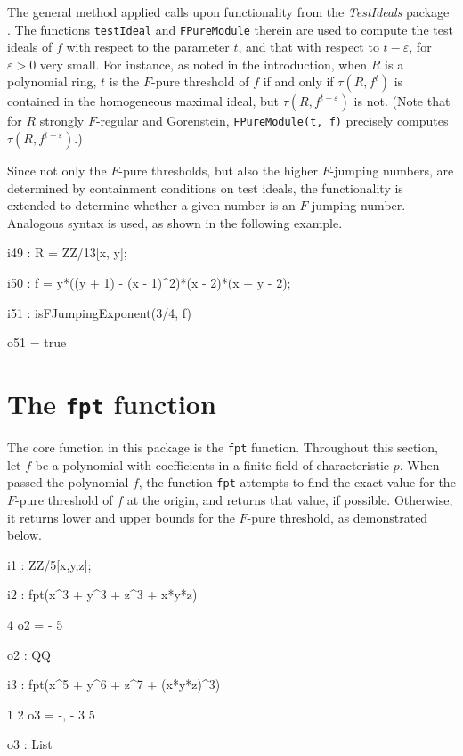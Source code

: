 \documentclass{amsart}
\begin{document}
The general method applied calls upon functionality from the \emph{TestIdeals} package \cite{TestIdealsPackage, TestIdealsPaper}.  The functions {\tt testIdeal} and {\tt FPureModule} therein are used
to compute the test ideals of $f$ with respect to the parameter $t$, and that with respect to $t - \varepsilon$, for $\varepsilon>0$ very small. For instance, as noted in the introduction, when $R$ is a polynomial ring, $t$ is the $F$-pure threshold of $f$ if and only if $\tau(R, f^t)$ is contained in the homogeneous maximal ideal, but 
$\tau(R, f^{t-\varepsilon})$ is not. 
(Note that for $R$ strongly $F$-regular and Gorenstein, {\tt FPureModule(t, f)} precisely computes $\tau(R, f^{t-\varepsilon})$.)  

Since not only the $F$-pure thresholds, but also the higher $F$-jumping numbers, are determined by containment conditions on test ideals, the functionality is extended to determine whether a given number is an $F$-jumping number.
Analogous syntax is used, as shown in the following example. 

{\small
{}
\begin{MyVerbatim}

i49 : R = ZZ/13[x, y];

i50 : f = y*((y + 1) - (x - 1)^2)*(x - 2)*(x + y - 2);

i51 : isFJumpingExponent(3/4, f)

o51 = true
\end{MyVerbatim}
}
\medspace

\section{The {\tt fpt} function}
\label{sec.FPT}

The core function in this package is the {\tt fpt} function.  Throughout this section, let $f$ be a polynomial with coefficients in a finite field of characteristic $p$. When passed the polynomial $f$, the function {\tt fpt} attempts to find the exact value for the $F$-pure threshold of $f$ at the origin, and returns that value, if possible.  Otherwise, it returns lower and upper bounds for the $F$-pure threshold, as demonstrated below.

{\small
{}
\begin{MyVerbatim}

i1 : ZZ/5[x,y,z];

i2 : fpt(x^3 + y^3 + z^3 + x*y*z)

     4
o2 = -
     5

o2 : QQ

i3 : fpt(x^5 + y^6 + z^7 + (x*y*z)^3)

      1  2
o3 = {-, -}
      3  5

o3 : List
\end{MyVerbatim}
}
\medspace
\end{document}

